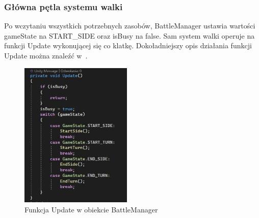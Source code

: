 \documentclass{SGGW-thesis}
\begin{document}
\subsubsection{Główna pętla systemu walki}
Po wczytaniu wszystkich potrzebnych zasobów, BattleManager ustawia wartości gameState na START\_SIDE oraz isBusy na false. Sam system walki operuje na funkcji Update wykonującej się co klatkę. Dokoładniejszy opis działania funkcji Update można znaleźć w~\cite{UnityDocs}. 
\begin{figure}[H]
  \centering
  \includegraphics[height=7cm]{updatebattle.JPG}
  \caption{Funkcja Update w obiekcie BattleManager}
  \label{fig:UpdateBattle}
\end{figure}
\end{document}
